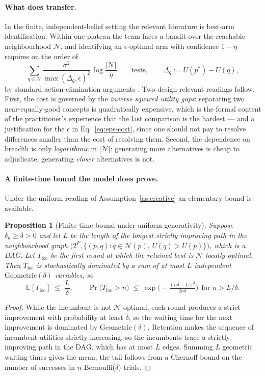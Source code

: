 \documentclass[11pt]{article}
\newtheorem{proposition}{Proposition}
\newcommand{\E}{\mathbb{E}}
\begin{document}
\paragraph{What does transfer.} In the finite, independent-belief setting the relevant literature is best-arm identification. Within one plateau the team faces a bandit over the reachable neighbourhood $\mathcal{N}$, and identifying an $\epsilon$-optimal arm with confidence $1-\eta$ requires on the order of
\begin{equation}
\label{eq:bai}
\sum_{q\in\mathcal N}\frac{\sigma^2}{\max(\Delta_q,\epsilon)^2}\,\log\!\frac{|\mathcal N|}{\eta}
\qquad\text{tests}, \qquad \Delta_q := U(p^*)-U(q),
\end{equation}
by standard action-elimination arguments \citep{evendar2006, bubeck2012}. Two design-relevant readings follow. First, the cost is governed by the \emph{inverse squared utility gaps}: separating two near-equally-good concepts is quadratically expensive, which is the formal content of the practitioner's experience that the last comparison is the hardest --- and a justification for the $\epsilon$ in Eq.~\eqref{eq:eps-cost}, since one should not pay to resolve differences smaller than the cost of resolving them. Second, the dependence on breadth is only \emph{logarithmic} in $|\mathcal N|$: generating more alternatives is cheap to adjudicate, generating \emph{closer} alternatives is not.

\paragraph{A finite-time bound the model does prove.} Under the uniform reading of Assumption~\ref{as:creative} an elementary bound is available.

\begin{proposition}[Finite-time bound under uniform generativity]
\label{prop:rate}
Suppose $\delta_k\ge\delta>0$ and let $L$ be the length of the longest strictly improving path in the neighbourhood graph $\big(2^F,\{(p,q):q\in\mathcal N(p),\,U(q)>U(p)\}\big)$, which is a DAG. Let $T_{\mathrm{loc}}$ be the first round at which the retained best is $\mathcal{N}$-locally optimal. Then $T_{\mathrm{loc}}$ is stochastically dominated by a sum of at most $L$ independent $\mathrm{Geometric}(\delta)$ variables, so
\[
\E[T_{\mathrm{loc}}]\;\le\;\frac{L}{\delta},
\qquad
\Pr\big(T_{\mathrm{loc}}>n\big)\;\le\;\exp\!\Big(-\tfrac{(n\delta-L)^2}{2n\delta}\Big)\ \ \text{for } n>L/\delta .
\]
\end{proposition}
\begin{proof}
While the incumbent is not $\mathcal{N}$-optimal, each round produces a strict improvement with probability at least $\delta$, so the waiting time for the next improvement is dominated by $\mathrm{Geometric}(\delta)$. Retention makes the sequence of incumbent utilities strictly increasing, so the incumbents trace a strictly improving path in the DAG, which has at most $L$ edges. Summing $L$ geometric waiting times gives the mean; the tail follows from a Chernoff bound on the number of successes in $n$ Bernoulli($\delta$) trials.
\end{proof}
\end{document}
